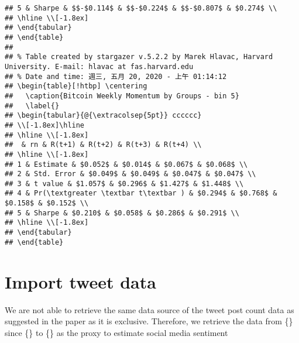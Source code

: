 \documentclass[
]{article}
\begin{document}
\begin{verbatim}
## 5 & Sharpe & $$-$0.114$ & $$-$0.224$ & $$-$0.807$ & $0.274$ \\ 
## \hline \\[-1.8ex] 
## \end{tabular} 
## \end{table} 
## 
## % Table created by stargazer v.5.2.2 by Marek Hlavac, Harvard University. E-mail: hlavac at fas.harvard.edu
## % Date and time: 週三, 五月 20, 2020 - 上午 01:14:12
## \begin{table}[!htbp] \centering 
##   \caption{Bitcoin Weekly Momentum by Groups - bin 5} 
##   \label{} 
## \begin{tabular}{@{\extracolsep{5pt}} cccccc} 
## \\[-1.8ex]\hline 
## \hline \\[-1.8ex] 
##  & rn & R(t+1) & R(t+2) & R(t+3) & R(t+4) \\ 
## \hline \\[-1.8ex] 
## 1 & Estimate & $0.052$ & $0.014$ & $0.067$ & $0.068$ \\ 
## 2 & Std. Error & $0.049$ & $0.049$ & $0.047$ & $0.047$ \\ 
## 3 & t value & $1.057$ & $0.296$ & $1.427$ & $1.448$ \\ 
## 4 & Pr(\textgreater \textbar t\textbar ) & $0.294$ & $0.768$ & $0.158$ & $0.152$ \\ 
## 5 & Sharpe & $0.210$ & $0.058$ & $0.286$ & $0.291$ \\ 
## \hline \\[-1.8ex] 
## \end{tabular} 
## \end{table}
\end{verbatim}

\hypertarget{import-tweet-data}{%
\section{Import tweet data}\label{import-tweet-data}}

We are not able to retrieve the same data source of the tweet post count
data as suggested in the paper as it is exclusive. Therefore, we
retrieve the data from \{\} since \{\} to \{\} as the proxy to estimate
social media sentiment
\end{document}
